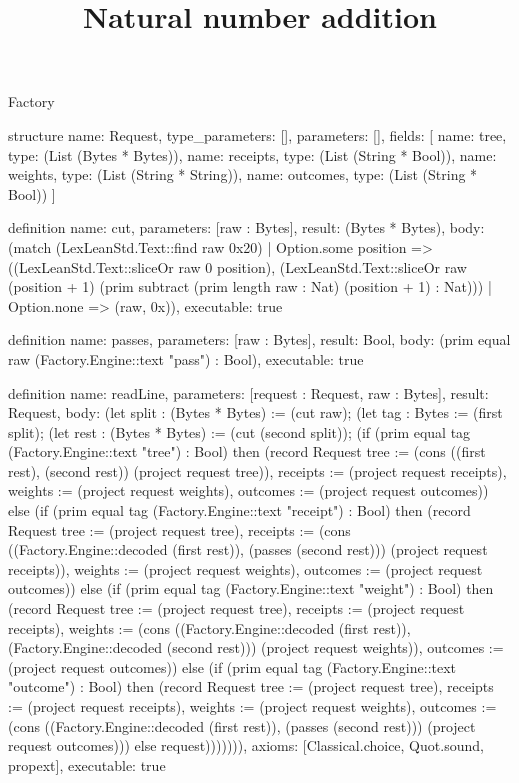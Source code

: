 \begin{lexlean}{Factory}
\title{Natural number addition}
\begin{semanticmodule}
structure{
  name: Request,
  type_parameters: [],
  parameters: [],
  fields: [
    {name: tree, type: (List (Bytes * Bytes))},
    {name: receipts, type: (List (String * Bool))},
    {name: weights, type: (List (String * String))},
    {name: outcomes, type: (List (String * Bool))}
  ]
}

definition{
  name: cut,
  parameters: [raw : Bytes],
  result: (Bytes * Bytes),
  body: (match (LexLeanStd.Text::find raw 0x20)
    | Option.some position => ((LexLeanStd.Text::sliceOr raw 0 position), (LexLeanStd.Text::sliceOr raw (position + 1) (prim subtract (prim length raw : Nat) (position + 1) : Nat)))
    | Option.none => (raw, 0x)),
  executable: true
}

definition{
  name: passes,
  parameters: [raw : Bytes],
  result: Bool,
  body: (prim equal raw (Factory.Engine::text "pass") : Bool),
  executable: true
}

definition{
  name: readLine,
  parameters: [request : Request, raw : Bytes],
  result: Request,
  body: (let split : (Bytes * Bytes) := (cut raw); (let tag : Bytes := (first split); (let rest : (Bytes * Bytes) := (cut (second split)); (if (prim equal tag (Factory.Engine::text "tree") : Bool) then (record Request {tree := (cons ((first rest), (second rest)) (project request tree)), receipts := (project request receipts), weights := (project request weights), outcomes := (project request outcomes)}) else (if (prim equal tag (Factory.Engine::text "receipt") : Bool) then (record Request {tree := (project request tree), receipts := (cons ((Factory.Engine::decoded (first rest)), (passes (second rest))) (project request receipts)), weights := (project request weights), outcomes := (project request outcomes)}) else (if (prim equal tag (Factory.Engine::text "weight") : Bool) then (record Request {tree := (project request tree), receipts := (project request receipts), weights := (cons ((Factory.Engine::decoded (first rest)), (Factory.Engine::decoded (second rest))) (project request weights)), outcomes := (project request outcomes)}) else (if (prim equal tag (Factory.Engine::text "outcome") : Bool) then (record Request {tree := (project request tree), receipts := (project request receipts), weights := (project request weights), outcomes := (cons ((Factory.Engine::decoded (first rest)), (passes (second rest))) (project request outcomes))}) else request))))))),
  axioms: [Classical.choice, Quot.sound, propext],
  executable: true
}


\end{semanticmodule}
\end{lexlean}

